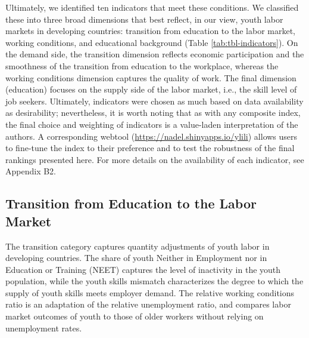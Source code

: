 \documentclass[
  a4paper, twoside, 12pt]{book}
\begin{document}
Ultimately, we identified ten indicators that meet these conditions. We classified these into three broad dimensions that best reflect, in our view, youth labor markets in developing countries: transition from education to the labor market, working conditions, and educational background (Table \ref{tab:tbl-indicators}). On the demand side, the transition dimension reflects economic participation and the smoothness of the transition from education to the workplace, whereas the working conditions dimension captures the quality of work. The final dimension (education) focuses on the supply side of the labor market, i.e., the skill level of job seekers. Ultimately, indicators were chosen as much based on data availability as desirability; nevertheless, it is worth noting that as with any composite index, the final choice and weighting of indicators is a value-laden interpretation of the authors. A corresponding webtool (\url{https://nadel.shinyapps.io/ylili}) allows users to fine-tune the index to their preference and to test the robustness of the final rankings presented here. For more details on the availability of each indicator, see Appendix B2.

\begin{singlespacing}

\end{singlespacing}

\hypertarget{transition-from-education-to-the-labor-market}{%
\subsection{Transition from Education to the Labor Market}\label{transition-from-education-to-the-labor-market}}

The transition category captures quantity adjustments of youth labor in developing countries. The share of youth Neither in Employment nor in Education or Training (NEET) captures the level of inactivity in the youth population, while the youth skills mismatch characterizes the degree to which the supply of youth skills meets employer demand. The relative working conditions ratio is an adaptation of the relative unemployment ratio, and compares labor market outcomes of youth to those of older workers without relying on unemployment rates.
\end{document}
